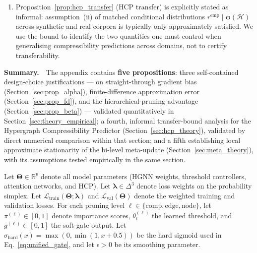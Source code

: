 \documentclass[10pt]{article}
\theoremstyle{plain}
\theoremstyle{definition}
\begin{document}
\begin{tcolorbox}
\begin{enumerate}[
    leftmargin=*,
    labelsep=8pt,
    itemsep=5pt,
    topsep=2pt,
    label=\textcolor{boxGreenDeep}{\textbf{\arabic*.}}
]
\item Proposition~\ref{prop:hcp_transfer} (HCP transfer) is explicitly stated as informal: assumption~(ii) of matched conditional distributions $r^{\mathrm{emp}}\mid\boldsymbol{\phi}(\mathcal{H})$ across synthetic and real corpora is typically only approximately      satisfied. We use the bound to identify the two quantities one must control when generalising compressibility predictions across domains, not to certify transferability.
\end{enumerate}

\vspace{6pt}

\begin{tcolorbox}[
    colback=boxGreenSoft,
    colframe=boxGreenDeep,
    boxrule=0.5pt,
    arc=1pt,
    left=10pt, right=10pt, top=5pt, bottom=5pt,
    fontupper=\small,
]
\textbf{\textcolor{boxGreenDeep}{Summary.}}\ \ The appendix contains \textbf{five propositions}: three self-contained design-choice justifications --- on straight-through gradient bias (Section~\ref{sec:prop_alpha}), finite-difference approximation error (Section~\ref{sec:prop_fd}), and the hierarchical-pruning advantage (Section~\ref{sec:prop_beta}) --- validated quantitatively in Section~\ref{sec:theory_empirical}; a fourth, informal transfer-bound analysis for the Hypergraph Compressibility Predictor (Section~\ref{sec:hcp_theory}), validated by direct numerical comparison within that section; and a fifth establishing local approximate stationarity of the bi-level meta-update (Section~\ref{sec:meta_theory}), with its assumptions tested empirically in the same section.
\end{tcolorbox}

\end{tcolorbox}

Let $\boldsymbol{\Theta}\in\mathbb{R}^{p}$ denote all model parameters (HGNN weights, threshold controllers, attention networks, and HCP). Let $\boldsymbol{\lambda}\in\Delta^{3}$ denote loss weights on the probability simplex. Let $\mathcal{L}_{\mathrm{train}}(\boldsymbol{\Theta};\boldsymbol{\lambda})$ and $\mathcal{L}_{\mathrm{val}}(\boldsymbol{\Theta})$ denote the weighted training and validation losses. For each pruning level $\ell\in\{\mathrm{comp,edge,node}\}$, let $\pi^{(\ell)}\in[0,1]$ denote importance scores, $\theta_t^{(\ell)}$ the learned threshold, and $g^{(\ell)}\in[0,1]$ the soft-gate output. Let $\sigma_{\mathrm{hard}}(x)=\max(0,\min(1,x+0.5))$ be the hard sigmoid used in Eq.~\eqref{eq:unified_gate}, and let $\epsilon>0$ be its smoothing parameter.
\end{document}
